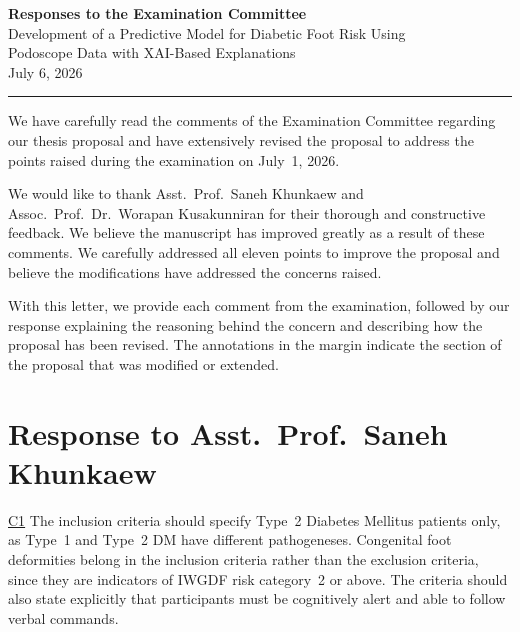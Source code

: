 \documentclass[12pt,a4paper]{article}
\newcommand{\cid}[1]{{\color{cidred}\underline{#1}}}
\begin{document}
\begin{center}
  {\large\bfseries Responses to the Examination Committee}\\[5pt]
  {\normalsize Development of a Predictive Model for Diabetic Foot Risk Using\\
  Podoscope Data with XAI-Based Explanations}\\[6pt]
  {\normalsize July 6, 2026}
\end{center}

\medskip\hrule\medskip

\setlength{\parindent}{1.5em}

We have carefully read the comments of the Examination Committee regarding our thesis proposal and have extensively revised the proposal to address the points raised during the examination on July~1, 2026.

We would like to thank Asst.\ Prof.\ Saneh Khunkaew and Assoc.\ Prof.\ Dr.\ Worapan Kusakunniran for their thorough and constructive feedback. We believe the manuscript has improved greatly as a result of these comments. We carefully addressed all eleven points to improve the proposal and believe the modifications have addressed the concerns raised.

With this letter, we provide each comment from the examination, followed by our response explaining the reasoning behind the concern and describing how the proposal has been revised. The annotations in the margin indicate the section of the proposal that was modified or extended.

\setlength{\parindent}{0pt}

\section*{Response to Asst.\ Prof.\ Saneh Khunkaew}

\cid{C1} The inclusion criteria should specify Type~2 Diabetes Mellitus patients only, as Type~1 and Type~2 DM have different pathogeneses. Congenital foot deformities belong in the inclusion criteria rather than the exclusion criteria, since they are indicators of IWGDF risk category~2 or above. The criteria should also state explicitly that participants must be cognitively alert and able to follow verbal commands.
\end{document}
